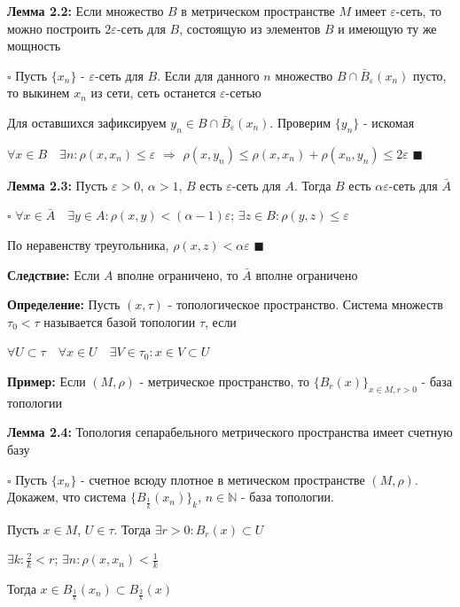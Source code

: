 \documentclass[a4paper]{report}
\begin{document}
\noindent\textbf{Лемма 2.2:} Если множество $B$ в метрическом пространстве $M$ имеет $\varepsilon$-сеть, то можно построить
$2\varepsilon$-сеть для $B$, состоящую из элементов $B$ и имеющую ту же мощность

\noindent $\square$ Пусть $\{x_n\}$ - $\varepsilon$-сеть для $B$. Если для данного $n$ множество $B\cap\bar B_\varepsilon(x_n)$ 
пусто, то выкинем $x_n$ из сети, сеть останется $\varepsilon$-сетью

Для оставшихся зафиксируем $y_n\in B\cap\bar B_\varepsilon(x_n)$. Проверим $\{y_n\}$ - искомая

$\forall x\in B\quad\exists n\colon\rho(x,x_n)\le\varepsilon$ $\Rightarrow$ $\rho(x,y_n)\le\rho(x,x_n)+\rho(x_n,y_n)
\le 2\varepsilon$ $\blacksquare$
\bigskip

\noindent\textbf{Лемма 2.3:} Пусть $\varepsilon>0$, $\alpha>1$, $B$ есть $\varepsilon$-сеть для $A$. Тогда $B$ есть 
$\alpha\varepsilon$-сеть для $\bar A$

\noindent $\square$ $\forall x\in\bar A\quad\exists y\in A\colon\rho(x,y)<(\alpha-1)\varepsilon$;
$\exists z\in B\colon\rho(y,z)\le\varepsilon$

 По неравенству треугольника, $\rho(x,z)<\alpha\varepsilon$ $\blacksquare$
\bigskip


\noindent\textbf{Следствие:} Если $A$ вполне ограничено, то $\bar A$ вполне ограничено
\bigskip

\noindent\textbf{Определение:} Пусть $(x,\tau)$ - топологическое пространство. Система множеств $\tau_0<\tau$ называется базой
топологии $\tau$, если 

$\forall U\subset\tau\quad\forall x\in U\quad\exists V\in\tau_0\colon x\in V\subset U$
\bigskip

\noindent\textbf{Пример:} Если $(M,\rho)$ - метрическое пространство, то $\{B_r(x)\}_{x\in M,r>0}$ - база топологии
\bigskip

\noindent\textbf{Лемма 2.4:} Топология сепарабельного метрического пространства имеет счетную базу

\noindent $\square$ Пусть $\{x_n\}$ - счетное всюду плотное в метическом пространстве $(M,\rho)$. Докажем, что система 
$\{B_{\frac1k}(x_n)\}_k$, $n\in\mathbb N$ - база топологии.

Пусть $x\in M$, $U\in\tau$. Тогда $\exists r>0\colon B_r(x)\subset U$

$\exists k\colon\frac2k<r$; $\exists n\colon\rho(x,x_n)<\frac1k$ 

Тогда $x\in B_{\frac1k}(x_n)\subset B_{\frac2k}(x)$
\end{document}

